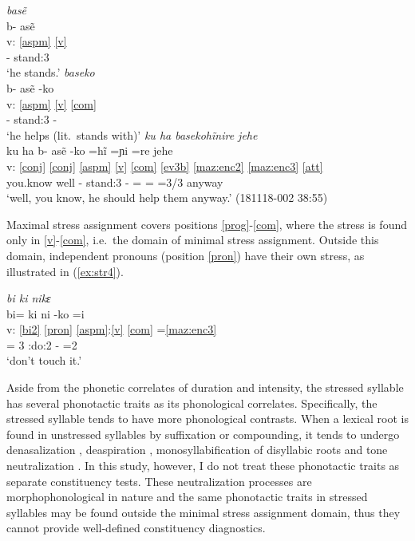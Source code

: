 \documentclass[output=paper]{langscibook}
\begin{document}
\ea
\ea \label{ex:str1} \textit{ba\2\st{}sẽ\4}\\
\glll {} b- a\2sẽ\4\\
v: \ref{aspm} \ref{v}\\
{} \Hab- stand:3\\
\glt `he stands.'
\ex \label{ex:str2} \textit{ba\2se\2\st{}ko\1\3}\\
\glll {} b- a\2sẽ\4 -ko\1\3\\
v: \ref{aspm} \ref{v} \ref{com}\\
{} \Hab- stand:3 -\Com\\
\glt `he helps (lit.~stands with)'
\ex \label{ex:str3} \textit{\ssn{}ku\1 ha\1 ba\2se\2\st{}ko\1\3hĩ\4ni\2\3re\1 je\2he\2}\\
\glll {} \ssn{}ku\1 ha\1 b- a\2sẽ\4 -ko\1\3 =hĩ\4 =ɲi\2\3 =re\1 je\2he\2\\
v: \ref{conj} \ref{conj} \ref{aspm} \ref{v} \ref{com} \ref{ev3b} \ref{maz:enc2} \ref{maz:enc3} \ref{att}\\
{} you.know well \Hab- stand:3 -\Com{} =\Infr{} =\Asr{} =3/3 anyway\\
\glt `well, you know, he should help them anyway.' (181118-002 38:55)

\z
\z

Maximal stress assignment covers positions \ref{prog}-\ref{com}, where the stress is found only in \ref{v}-\ref{com}, i.e.~the domain of minimal stress assignment. Outside this domain, independent pronouns (position \ref{pron}) %
have their own stress, as illustrated in (\ref{ex:str4}).%

\ea \label{ex:str4} \textit{bi\4 \st{}k\lab{}i\2 ni\2\st{}k\lab{}ɛ\1\3}\\
\glll {} bi\4= k\lab{}i\2 ni\2 -ko\1\3 =i\\
v: \ref{bi2} \ref{pron} \ref{aspm}:\ref{v} \ref{com} =\ref{maz:enc3}\\
{} \Neg= \Pronom{}3 \Hab:do:2 -\Com{} =2\Sg\\
\glt `don't touch it.'
\z

Aside from the phonetic correlates of duration and intensity, the stressed syllable has several phonotactic traits as its phonological correlates. Specifically, the stressed syllable tends to have more phonological contrasts. When a lexical root is found in unstressed syllables by suffixation or compounding, it tends to undergo denasalization  \citep[110--111]{nakamoto20}, deaspiration \citep[111--113]{nakamoto20}, monosyllabification of disyllabic roots \citep[113--114]{nakamoto20} and tone neutralization \citep[154--161]{nakamoto20}.
In this study, however, I do not treat these phonotactic traits as separate constituency tests. These neutralization processes are morphophonological in nature and the same phonotactic traits in stressed syllables may be found outside the minimal stress assignment domain, thus they cannot provide well-defined constituency diagnostics. 
\end{document}
